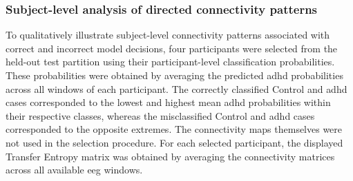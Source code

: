 \subsubsection{Subject-level analysis of directed connectivity patterns}

To qualitatively illustrate subject-level connectivity patterns associated with correct and incorrect model decisions, four participants were selected from the held-out test partition using their participant-level classification probabilities. These probabilities were obtained by averaging the predicted \gls{adhd} probabilities across all windows of each participant. The correctly classified Control and \gls{adhd} cases corresponded to the lowest and highest mean \gls{adhd} probabilities within their respective classes, whereas the misclassified Control and \gls{adhd} cases corresponded to the opposite extremes. The connectivity maps themselves were not used in the selection procedure. For each selected participant, the displayed Transfer Entropy matrix was obtained by averaging the connectivity matrices across all available \gls{eeg} windows.
